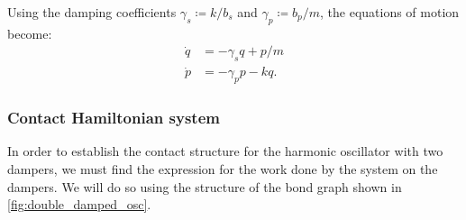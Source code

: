 Using the damping coefficients $\gamma_s \coloneq k/b_s$ and $\gamma_p \coloneq b_p/m$, the equations of motion become:
\begin{equation}
    \begin{split}
        \dot{q} &= -\gamma_s q + p/m  \\
        \dot{p} &= -\gamma_p p - kq.
    \end{split}
    \label{eq:serial_eom_pq}
\end{equation}


\subsubsection{Contact Hamiltonian system} 
In order to establish the contact structure for the harmonic oscillator with two dampers, we must find the expression for the work done by the system on the dampers. We will do so using the structure of the bond graph shown in \cref{fig:double_damped_osc}. 

